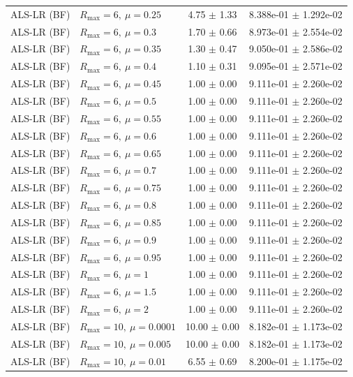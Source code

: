 \begin{table}[t]
\begin{tabular}{@{}llcc@{}}
ALS-LR (BF) & \(R_{\max}=6,\ \mu=0.25\) & 4.75 $\pm$ 1.33 & 8.388e-01 $\pm$ 1.292e-02 \\
ALS-LR (BF) & \(R_{\max}=6,\ \mu=0.3\) & 1.70 $\pm$ 0.66 & 8.973e-01 $\pm$ 2.554e-02 \\
ALS-LR (BF) & \(R_{\max}=6,\ \mu=0.35\) & 1.30 $\pm$ 0.47 & 9.050e-01 $\pm$ 2.586e-02 \\
ALS-LR (BF) & \(R_{\max}=6,\ \mu=0.4\) & 1.10 $\pm$ 0.31 & 9.095e-01 $\pm$ 2.571e-02 \\
ALS-LR (BF) & \(R_{\max}=6,\ \mu=0.45\) & 1.00 $\pm$ 0.00 & 9.111e-01 $\pm$ 2.260e-02 \\
ALS-LR (BF) & \(R_{\max}=6,\ \mu=0.5\) & 1.00 $\pm$ 0.00 & 9.111e-01 $\pm$ 2.260e-02 \\
ALS-LR (BF) & \(R_{\max}=6,\ \mu=0.55\) & 1.00 $\pm$ 0.00 & 9.111e-01 $\pm$ 2.260e-02 \\
ALS-LR (BF) & \(R_{\max}=6,\ \mu=0.6\) & 1.00 $\pm$ 0.00 & 9.111e-01 $\pm$ 2.260e-02 \\
ALS-LR (BF) & \(R_{\max}=6,\ \mu=0.65\) & 1.00 $\pm$ 0.00 & 9.111e-01 $\pm$ 2.260e-02 \\
ALS-LR (BF) & \(R_{\max}=6,\ \mu=0.7\) & 1.00 $\pm$ 0.00 & 9.111e-01 $\pm$ 2.260e-02 \\
ALS-LR (BF) & \(R_{\max}=6,\ \mu=0.75\) & 1.00 $\pm$ 0.00 & 9.111e-01 $\pm$ 2.260e-02 \\
ALS-LR (BF) & \(R_{\max}=6,\ \mu=0.8\) & 1.00 $\pm$ 0.00 & 9.111e-01 $\pm$ 2.260e-02 \\
ALS-LR (BF) & \(R_{\max}=6,\ \mu=0.85\) & 1.00 $\pm$ 0.00 & 9.111e-01 $\pm$ 2.260e-02 \\
ALS-LR (BF) & \(R_{\max}=6,\ \mu=0.9\) & 1.00 $\pm$ 0.00 & 9.111e-01 $\pm$ 2.260e-02 \\
ALS-LR (BF) & \(R_{\max}=6,\ \mu=0.95\) & 1.00 $\pm$ 0.00 & 9.111e-01 $\pm$ 2.260e-02 \\
ALS-LR (BF) & \(R_{\max}=6,\ \mu=1\) & 1.00 $\pm$ 0.00 & 9.111e-01 $\pm$ 2.260e-02 \\
ALS-LR (BF) & \(R_{\max}=6,\ \mu=1.5\) & 1.00 $\pm$ 0.00 & 9.111e-01 $\pm$ 2.260e-02 \\
ALS-LR (BF) & \(R_{\max}=6,\ \mu=2\) & 1.00 $\pm$ 0.00 & 9.111e-01 $\pm$ 2.260e-02 \\
ALS-LR (BF) & \(R_{\max}=10,\ \mu=0.0001\) & 10.00 $\pm$ 0.00 & 8.182e-01 $\pm$ 1.173e-02 \\
ALS-LR (BF) & \(R_{\max}=10,\ \mu=0.005\) & 10.00 $\pm$ 0.00 & 8.182e-01 $\pm$ 1.173e-02 \\
ALS-LR (BF) & \(R_{\max}=10,\ \mu=0.01\) & 6.55 $\pm$ 0.69 & 8.200e-01 $\pm$ 1.175e-02 \\

\end{tabular}
\end{table}
